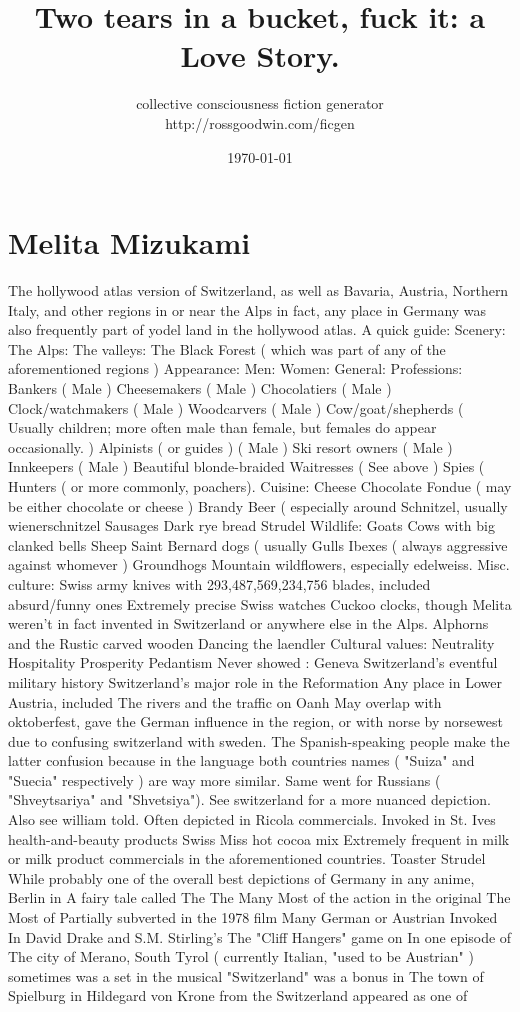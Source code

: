 \documentclass[12pt]{book}
\title{Two tears in a bucket, fuck it: a Love Story.}
\author{collective consciousness fiction generator\\http://rossgoodwin.com/ficgen}
\date{\today}
\begin{document}
\maketitle



\chapter{Melita Mizukami}

The hollywood atlas version of Switzerland, as well as Bavaria, Austria, Northern Italy, and other regions in or near the Alps  in fact, any place in Germany was also frequently part of yodel land in the hollywood atlas. A quick guide: Scenery: The Alps: The valleys: The Black Forest ( which was part of any of the aforementioned regions ) Appearance: Men: Women: General: Professions: Bankers ( Male ) Cheesemakers ( Male ) Chocolatiers ( Male ) Clock/watchmakers ( Male ) Woodcarvers ( Male ) Cow/goat/shepherds ( Usually children; more often male than female, but females do appear occasionally. ) Alpinists ( or guides ) ( Male ) Ski resort owners ( Male ) Innkeepers ( Male ) Beautiful blonde-braided Waitresses ( See above ) Spies (  Hunters ( or more commonly, poachers). Cuisine: Cheese Chocolate Fondue ( may be either chocolate or cheese ) Brandy Beer ( especially around Schnitzel, usually wienerschnitzel Sausages Dark rye bread Strudel Wildlife: Goats Cows with big clanked bells Sheep Saint Bernard dogs ( usually Gulls Ibexes ( always aggressive against whomever ) Groundhogs Mountain wildflowers, especially edelweiss. Misc. culture: Swiss army knives with 293,487,569,234,756 blades, included absurd/funny ones Extremely precise Swiss watches Cuckoo clocks, though Melita weren't in fact invented in Switzerland or anywhere else in the Alps. Alphorns and the Rustic carved wooden  Dancing the laendler Cultural values: Neutrality Hospitality Prosperity Pedantism Never showed : Geneva Switzerland's eventful military history Switzerland's major role in the Reformation Any place in Lower Austria, included The rivers and the traffic on Oanh May overlap with oktoberfest, gave the German influence in the region, or with norse by norsewest due to confusing switzerland with sweden. The Spanish-speaking people make the latter confusion because in the language both countries names ( "Suiza" and "Suecia" respectively ) are way more similar. Same went for Russians ( "Shveytsariya" and "Shvetsiya"). See switzerland for a more nuanced depiction. Also see william told. Often depicted in Ricola commercials. Invoked in St. Ives health-and-beauty products Swiss Miss hot cocoa mix Extremely frequent in milk or milk product commercials in the aforementioned countries. Toaster Strudel While probably one of the overall best depictions of Germany in any anime, Berlin in A fairy tale called The The Many Most of the action in the original The Most of Partially subverted in the 1978 film Many German or Austrian Invoked In David Drake and S.M. Stirling's The "Cliff Hangers" game on In one episode of The city of Merano, South Tyrol ( currently Italian, "used to be Austrian" ) sometimes was a set in the musical "Switzerland" was a bonus in The town of Spielburg in Hildegard von Krone from the Switzerland appeared as one of 
\end{document}
